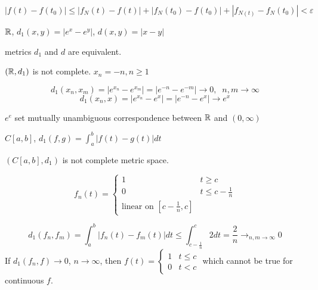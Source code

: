 \[ \left| f(t) - f(t_0) \right|  \le \left| f_{N}(t) - f(t) \right| + \left| f_{N}(t_0) - f(t_0) \right| + \left| f_{N(t)} - f_{N}(t_0) \right| < \varepsilon \] 

\hr

\begin{example}
  $\mathbb{R}$, $d_1(x,y) = \left| e^{x} - e^{y} \right|$, $d(x,y) = \left| x - y \right| $ 

  metrics $d_1$ and $d$ are equivalent.

  $(\mathbb{R}, d_1)$ is not complete. $x_{n} = -n, n\ge 1$ 

  \[ d_1(x_{n}, x_{m}) = \left| e^{x_n} - e^{x_m} \right| = \left| e^{-n} - e^{-m} \right| \to  0, \;\; n,m \to  \infty \] 
  \[ d_1(x_{n}, x) = \left| e^{x_n} - e^{x} \right| = \left| e^{-n} - e^{x} \right| \to  e^{x} \] 

  $e^{e}$ set mutually unambiguous correspondence between $\mathbb{R}$ and $(0, \infty)$
\end{example}

\begin{example}
  $C[a,b]$, $d_1(f,g) = \int_a^{b} \left| f(t) - g(t) \right| dt$

  $(C[a,b], d_1)$ is not complete metric space.

  \[ f_{n}(t) = \begin{cases}
    1 & t \ge c \\
    0 & t \le c - \frac{1}{n} \\
    \text{linear on } [c - \frac{1}{n}, c]
  \end{cases} \] 

  \[
  d_1(f_{n}, f_{m}) = \int_{a}^{b} \left| f_{n}(t) - f_{m}(t) \right| dt
\le \int_{c-\frac{1}{n}}^{c} 2 dt = \frac{2}{n} \to_{n,m \to \infty} 0    
\] 
If $d_1(f_{n}, f) \to 0$, $n \to  \infty$, then $f(t) = \begin{cases}
  1 & t \le c\\
  0 & t < c
\end{cases}$ which cannot be true for continuous $f$.
\end{example}

